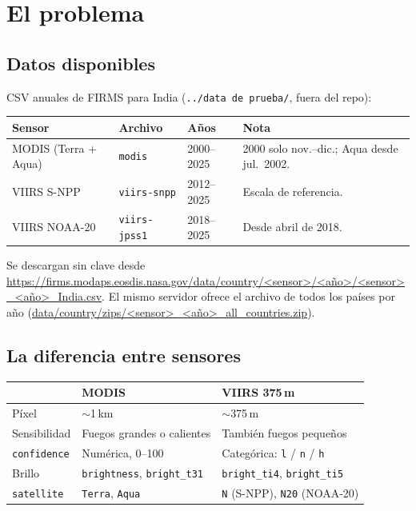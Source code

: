 \chapter{El problema}\label{cap:problema}

\section{Datos disponibles}

CSV anuales de FIRMS para India (\texttt{../data de prueba/}, fuera del repo):

\begin{tabularx}{\linewidth}{@{}lllX@{}}
\toprule
Sensor & Archivo & Años & Nota \\
\midrule
MODIS (Terra + Aqua) & \texttt{modis} & 2000--2025 & 2000 solo nov.--dic.; Aqua desde jul.\ 2002. \\
VIIRS S-NPP & \texttt{viirs-snpp} & 2012--2025 & Escala de referencia. \\
VIIRS NOAA-20 & \texttt{viirs-jpss1} & 2018--2025 & Desde abril de 2018. \\
\bottomrule
\end{tabularx}

Se descargan sin clave desde
\url{https://firms.modaps.eosdis.nasa.gov/data/country/<sensor>/<año>/<sensor>_<año>_India.csv}.
El mismo servidor ofrece el archivo de todos los países por año
(\url{data/country/zips/<sensor>_<año>_all_countries.zip}).

\section{La diferencia entre sensores}

\begin{tabularx}{\linewidth}{@{}lXX@{}}
\toprule
& MODIS & VIIRS 375\,m \\
\midrule
Píxel & $\sim$1\,km & $\sim$375\,m \\
Sensibilidad & Fuegos grandes o calientes & También fuegos pequeños \\
\texttt{confidence} & Numérica, 0--100 & Categórica: \texttt{l} / \texttt{n} / \texttt{h} \\
Brillo & \texttt{brightness}, \texttt{bright\_t31} & \texttt{bright\_ti4}, \texttt{bright\_ti5} \\
\texttt{satellite} & \texttt{Terra}, \texttt{Aqua} & \texttt{N} (S-NPP), \texttt{N20} (NOAA-20) \\
\bottomrule
\end{tabularx}

